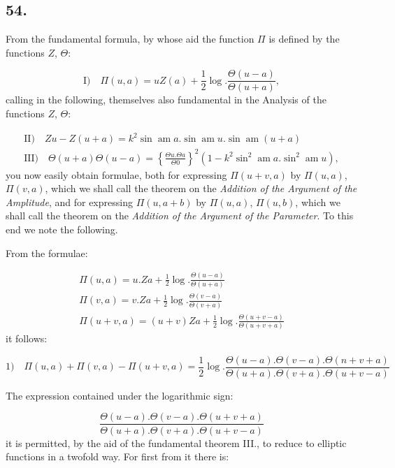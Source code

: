 \documentclass{article}
\begin{document}
\subsection*{54.}

From the fundamental formula, by whose aid the function $\Pi$ is defined by the functions $Z$, $\Theta$:

\[
\text{I)}\quad \Pi(u,a)=uZ(a)+\frac{1}{2}\log.\frac{\Theta(u-a)}{\Theta(u+a)},
\]
calling in the following, themselves also fundamental in the Analysis of the functions $Z$, $\Theta$:

\[
\begin{gathered}
\text{II)}\quad Zu-Z(u+a)=k^{2}\sin\operatorname{am}a.\sin\operatorname{am}u.\sin\operatorname{am}(u+a)\\[1.5ex]
\text{III)}\quad \Theta(u+a)\Theta(u-a)=\left\{\frac{\Theta u.\Theta a}{\Theta0}\right\}^{2}\left(1-k^{2}\sin^{2}\operatorname{am}a.\sin^{2}\operatorname{am}u\right),
\end{gathered}
\]
you now easily obtain formulae, both for expressing $\Pi(u+v,a)$ by $\Pi(u,a)$, $\Pi(v,a)$, which we shall call the theorem on the \emph{Addition of the Argument of the Amplitude}, and for expressing $\Pi(u,a+b)$ by $\Pi(u,a)$, $\Pi(u,b)$, which we shall call the theorem on the \emph{Addition of the Argument of the Parameter}. To this end we note the following.

From the formulae:

\[
\begin{gathered}
\Pi(u,a)=u.Za+\frac{1}{2}\log.\frac{\Theta(u-a)}{\Theta(u+a)}\\[1.5ex]
\Pi(v,a)=v.Za+\frac{1}{2}\log.\frac{\Theta(v-a)}{\Theta(v+a)}\\[1.5ex]
\Pi(u+v,a)=(u+v)Za+\frac{1}{2}\log.\frac{\Theta(u+v-a)}{\Theta(u+v+a)}
\end{gathered}
\]
it follows:

\[
\text{1)}\quad \Pi(u,a)+\Pi(v,a)-\Pi(u+v,a)=\frac{1}{2}\log.\frac{\Theta(u-a).\Theta(v-a).\Theta(n+v+a)}{\Theta(u+a).\Theta(v+a).\Theta(u+v-a)}
\]

The expression contained under the logarithmic sign:

\[
\frac{\Theta(u-a).\Theta(v-a).\Theta(u+v+a)}{\Theta(u+a).\Theta(v+a).\Theta(u+v-a)}
\]
it is permitted, by the aid of the fundamental theorem III., to reduce to elliptic functions in a twofold way. For first from it there is:
\end{document}
